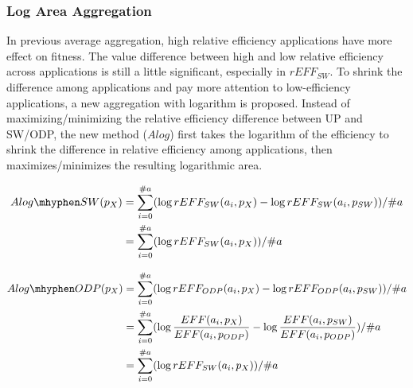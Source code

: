 \subsubsection{Log Area Aggregation}

In previous average aggregation, high relative efficiency applications have more effect on fitness. The value difference between high and low relative efficiency across applications is still a little significant, especially in $rEFF_{SW}$. To shrink the difference among applications and pay more attention to low-efficiency applications, a new aggregation with logarithm is proposed.
Instead of maximizing/minimizing the relative efficiency difference between UP and SW/ODP, the new method ($Alog$) first takes the logarithm of the efficiency to shrink the difference in relative efficiency among applications, then maximizes/minimizes the resulting logarithmic area.

\begingroup\makeatletter{}\check@mathfonts
\vspace{-8pt}
\begin{equation}
\begin{split}
	Alog\mhyphen SW(p_{X})
	&= \sum_{i=0}^{\#a} ( \log rEFF_{SW}(a_{i}, p_{X}) - \log rEFF_{SW}(a_{i}, p_{SW}) ) / \#a \\
	&= \sum_{i=0}^{\#a} ( \log rEFF_{SW}(a_{i}, p_{X}) ) / \#a 
\label{eq:logSW}
\end{split}
\end{equation}
\endgroup

\begingroup\makeatletter{}\check@mathfonts
\vspace{-8pt}
\begin{equation}
\begin{split}
	Alog\mhyphen ODP(p_{X})
	&= \sum_{i=0}^{\#a} ( \log rEFF_{ODP}(a_{i}, p_{X}) - \log rEFF_{ODP}(a_{i}, p_{SW}) ) / \#a \\
	&= \sum_{i=0}^{\#a} ( \log \frac{EFF(a_{i}, p_{X})}{EFF(a_{i}, p_{ODP})} - \log \frac{EFF(a_{i}, p_{SW})}{EFF(a_{i}, p_{ODP})} ) / \#a \\
	&= \sum_{i=0}^{\#a} ( \log rEFF_{SW}(a_{i}, p_{X}) ) / \#a
\label{eq:logOOP}
\end{split}
\end{equation}
\endgroup


